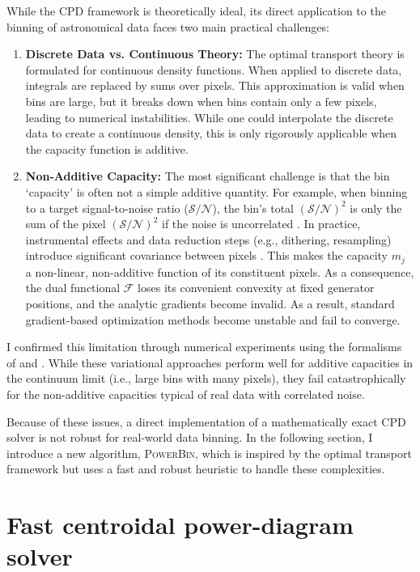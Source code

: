\documentclass[fleqn,usenatbib]{mnras}
\newcommand{\sn}{\mathcal{S/N}}
\begin{document}
While the CPD framework is theoretically ideal, its direct application to the binning of astronomical data faces two main practical challenges:
\begin{enumerate}
  \item \textbf{Discrete Data vs. Continuous Theory:} The optimal transport theory is formulated for continuous density functions. When applied to discrete data, integrals are replaced by sums over pixels. This approximation is valid when bins are large, but it breaks down when bins contain only a few pixels, leading to numerical instabilities. While one could interpolate the discrete data to create a continuous density, this is only rigorously applicable when the capacity function is additive.

  \item \textbf{Non-Additive Capacity:} The most significant challenge is that the bin `capacity' is often not a simple additive quantity. For example, when binning to a target signal-to-noise ratio ($\sn$), the bin's total $(\sn)^2$ is only the sum of the pixel $(\sn)^2$ if the noise is uncorrelated \citep[see][sec.~2]{Cappellari2003}. In practice, instrumental effects and data reduction steps (e.g., dithering, resampling) introduce significant covariance between pixels \citep[see][sec.~6.2]{Westfall2019}. This makes the capacity $m_j$ a non-linear, non-additive function of its constituent pixels. As a consequence, the dual functional $\mathcal{F}$ loses its convenient convexity at fixed generator positions, and the analytic gradients become invalid. As a result, standard gradient-based optimization methods become unstable and fail to converge.
\end{enumerate}

I confirmed this limitation through numerical experiments using the formalisms of \citet{Aurenhammer1998} and \citet{DeGoes2012}. While these variational approaches perform well for additive capacities in the continuum limit (i.e., large bins with many pixels), they fail catastrophically for the non-additive capacities typical of real data with correlated noise.

Because of these issues, a direct implementation of a mathematically exact CPD solver is not robust for real-world data binning. In the following section, I introduce a new algorithm, \textsc{PowerBin}, which is inspired by the optimal transport framework but uses a fast and robust heuristic to handle these complexities.

\section{Fast centroidal power-diagram solver}
\label{sec:fast_power_insight}
\end{document}

